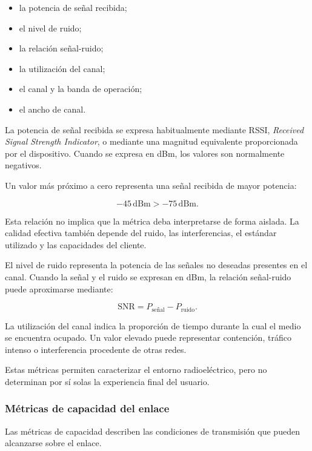 \begin{itemize}
    \item la potencia de señal recibida;

    \item el nivel de ruido;

    \item la relación señal-ruido;

    \item la utilización del canal;

    \item el canal y la banda de operación;

    \item el ancho de canal.
\end{itemize}

La potencia de señal recibida se expresa habitualmente mediante RSSI,
\textit{Received Signal Strength Indicator}, o mediante una magnitud
equivalente proporcionada por el dispositivo. Cuando se expresa en dBm,
los valores son normalmente negativos.

Un valor más próximo a cero representa una señal recibida de mayor
potencia:

\[
    -45\,\mathrm{dBm}
    >
    -75\,\mathrm{dBm}.
\]

Esta relación no implica que la métrica deba interpretarse de forma
aislada. La calidad efectiva también depende del ruido, las
interferencias, el estándar utilizado y las capacidades del cliente.

El nivel de ruido representa la potencia de las señales no deseadas
presentes en el canal. Cuando la señal y el ruido se expresan en dBm, la
relación señal-ruido puede aproximarse mediante:

\[
    \mathrm{SNR}
    =
    P_{\mathrm{señal}}
    -
    P_{\mathrm{ruido}}.
\]

La utilización del canal indica la proporción de tiempo durante la cual
el medio se encuentra ocupado. Un valor elevado puede representar
contención, tráfico intenso o interferencia procedente de otras redes.

Estas métricas permiten caracterizar el entorno radioeléctrico, pero no
determinan por sí solas la experiencia final del usuario.


\subsubsection*{Métricas de capacidad del enlace}

Las métricas de capacidad describen las condiciones de transmisión que
pueden alcanzarse sobre el enlace.

